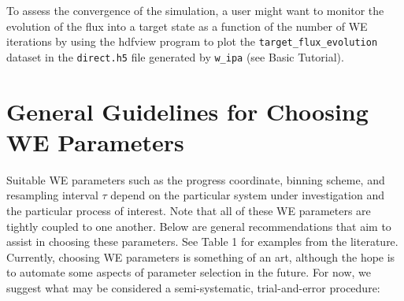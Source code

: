 \documentclass[9pt,tutorial,pubversion]{livecoms}
\begin{document}
To assess the convergence of the simulation, a user might want to monitor the evolution of the flux into a target state as a function of the number of WE iterations by using the hdfview program to plot the \verb|target_flux_evolution| dataset in the \verb|direct.h5| file generated by \verb|w_ipa| (see Basic Tutorial). 

\section{General Guidelines for Choosing WE Parameters}

Suitable WE parameters such as the progress coordinate, binning scheme, and resampling interval $\tau$ depend on the particular system under investigation and the particular process of interest. 
Note that all of these WE parameters are tightly coupled to one another. Below are general recommendations that aim to assist in choosing these parameters. 
See Table 1 for examples from the literature. 
Currently, choosing WE parameters is something of an art, although the hope is to automate some aspects of parameter selection in the future. 
For now, we suggest what may be considered a semi-systematic, trial-and-error procedure:
\end{document}
